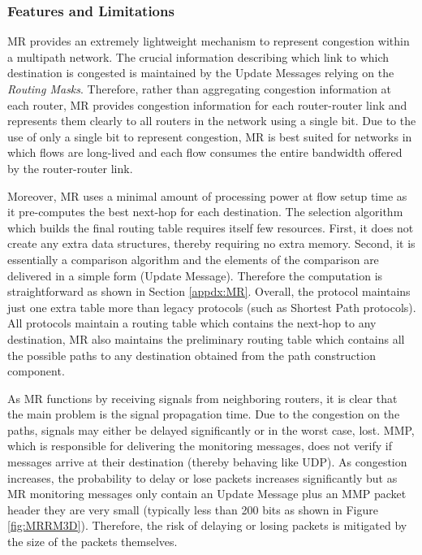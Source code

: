 

\subsubsection{Features and Limitations}

MR provides an extremely lightweight mechanism to represent congestion within a
multipath network. The crucial information describing which link to which
destination is congested is maintained by the Update Messages relying on the
\textit{Routing Masks}. Therefore, rather than aggregating congestion
information at each router, MR provides congestion information for each
router-router link and represents them clearly to all routers in the network
using a single bit. Due to the use of only a single bit to represent congestion,
MR is best suited for networks in which flows are long-lived and each flow
consumes the entire bandwidth offered by the router-router link. 

Moreover, MR uses a minimal amount of processing power at flow setup time as it
pre-computes the best next-hop for each destination. The selection algorithm
which builds the final routing table requires itself few resources. First, it
does not create any extra data structures, thereby requiring no extra memory.
Second, it is essentially a comparison algorithm and the elements of the
comparison are delivered in a simple form (Update Message). Therefore the
computation is
straightforward as shown in Section \ref{appdx:MR}. Overall, the  protocol
maintains just one extra table more than legacy protocols (such as
Shortest Path protocols). All protocols maintain a
routing table which contains the next-hop to any destination, MR also maintains the
preliminary routing table which contains all the possible paths to any
destination obtained from the path construction component.

As MR functions by receiving signals from neighboring routers, it is clear that
the main problem is the signal propagation time. Due to the congestion on the
paths, signals may either be delayed significantly or in the worst case, lost.
MMP, which is responsible for delivering the monitoring messages, does not
verify if messages arrive at their destination (thereby behaving like UDP). As
congestion increases, the probability to delay or lose packets increases
significantly but as MR monitoring messages only contain an Update Message
plus an MMP packet header they are very small (typically less than 200 bits as
shown in Figure \ref{fig:MRRM3D}). Therefore, the risk of delaying or losing
packets is mitigated by the size of the packets themselves. 

